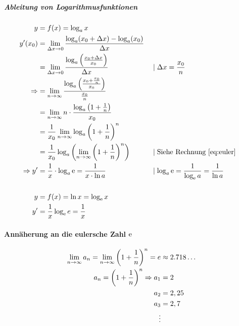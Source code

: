 \subparagraph{Ableitung von Logarithmusfunktionen}

\begin{align*}
	y              & = f(x) = \log_a x                                                                                                                                               \\
	y'(x_0)        & = \lim_{\Delta x \rightarrow 0} \frac{\log_a(x_0 + \Delta x) - \log_a(x_0)}{\Delta x}                                                                           \\
	               & = \lim_{\Delta x \rightarrow 0} \frac{\log_a \left( \frac{x_0 + \Delta x}{x_0} \right)}{\Delta x} &  & \mid \Delta x = \frac{x_0}{n}                            \\
	\Rightarrow    & = \lim_{n \rightarrow{} \infty} \frac{\log_a \left( \frac{x_0 + \frac{x_0}{n}} {x_0} \right)}{\frac{x_0}{n}}                                                                   \\
	               & = \lim_{n \rightarrow{} \infty} n \cdot \frac{\log_a \left( 1 + \frac{1}{n} \right)}{x_0}                                                                                      \\
	               & = \frac{1}{x_0} \lim_{n \rightarrow{} \infty} \log_a {\left( 1 + \frac{1}{n} \right)}^{n}                                                                                      \\
	               & = \frac{1}{x_0} \log_a \left( \lim_{n \rightarrow{} \infty} {\left( 1 + \frac{1}{n} \right)}^n \right)           &  & \mid \text{Siehe Rechnung~\ref{eq:euler}}                \\
	\Rightarrow y' & = \frac{1}{x} \cdot \log_a \mathop{}\!\mathrm{e} = \frac{1}{x \cdot \ln a}                                           &  & \mid \log_a \mathop{}\!\mathrm{e} = \frac{1}{\log_{\mathop{}\!\mathrm{e}} a} = \frac{1}{\ln a} \\
	\\
	y              & = f(x) = \ln x = \log_{\mathop{}\!\mathrm{e}} x                                                                                                                                    \\
	y'             & = \frac{1}{x} \log_{\mathop{}\!\mathrm{e}} e = \frac{1}{x}
\end{align*}


\paragraph{Annäherung an die eulersche Zahl \( \mathop{}\!\mathrm{e} \)}
\begin{align}
	\begin{split}
		\label{eq:euler}
		\lim_{n \rightarrow{} \infty} a_n = \lim_{n \rightarrow{} \infty} {\left( 1 + \frac{1}{n} \right)}^n = e &\approx 2.718\dots \\
		a_n = {\left( 1 + \frac{1}{n} \right)}^n
		\Rightarrow a_1 &= 2 \\
		a_2 &= 2,25 \\
		a_3 &= 2,7 \\
		\vdots
	\end{split}
\end{align}
